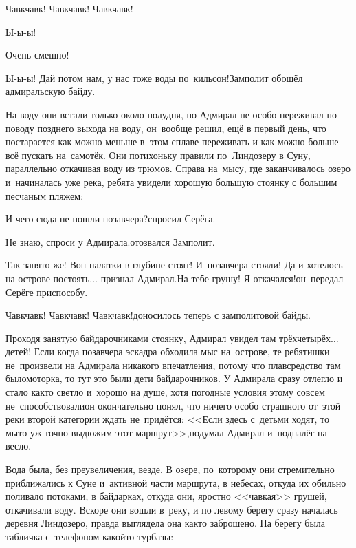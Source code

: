 \diagdash Чавк\sdash чавк! Чавк\sdash чавк! Чавк\sdash чавк!

\diagdash Ы-ы-ы!

\diagdash Очень смешно!

\diagdash Ы-ы-ы! Дай потом нам, у нас тоже воды по~кильсон!\mdash Замполит обошёл адмиральскую байду.

На воду они встали только около полудня, но Адмирал не особо переживал по поводу позднего выхода на воду, он~вообще решил, ещё в первый день, что постарается как можно меньше в~этом сплаве переживать и как можно больше всё пускать на~самотёк. Они потихоньку правили по~Линдозеру в Суну, параллельно откачивая воду из трюмов. Справа на~мысу, где заканчивалось озеро и~начиналась уже река, ребята увидели хорошую большую стоянку с большим песчаным пляжем:

\diagdash И чего сюда не пошли позавчера?\mdash спросил Серёга.

\diagdash Не знаю, спроси у Адмирала.\mdash отозвался Замполит.

\diagdash Так занято же! Вон палатки в глубине стоят! И~позавчера стояли! Да и хотелось на острове постоять$\ldots$ \mdash признал Адмирал.\mdash На тебе грушу! Я откачался!\mdash он~передал Серёге приспособу.

\diagdash Чавк\sdash чавк! Чавк\sdash чавк! Чавк\sdash чавк!\mdash доносилось теперь с замполитовой байды.

Проходя занятую байдарочниками стоянку, Адмирал увидел там трёх\sdash четырёх$\ldots$ детей! Если когда позавчера эскадра обходила мыс на~острове, те ребятишки не~произвели на Адмирала никакого впечатления, потому что плавсредство там было\mdash моторка, то тут это были дети байдарочников. У Адмирала сразу отлегло и стало как\sdash то светло и~хорошо на душе, хотя погодные условия этому совсем не~способствовали\mdash он окончательно понял, что ничего особо страшного от~этой реки второй категории ждать не~придётся: <<Если здесь с~детьми ходят, то мы\sdash то уж точно выдюжим этот маршрут>>,\mdash подумал Адмирал и~подналёг на весло.

Вода была, без преувеличения, везде. В озере, по~которому они стремительно приближались к Суне и~активной части маршрута, в небесах, откуда их обильно поливало потоками, в байдарках, откуда они, яростно <<чавкая>> грушей, откачивали воду. Вскоре они вошли в~реку, и по левому берегу сразу началась деревня Линдозеро, правда выглядела она как\sdash то заброшено. На берегу была табличка с~телефоном какой\sdash то турбазы:

